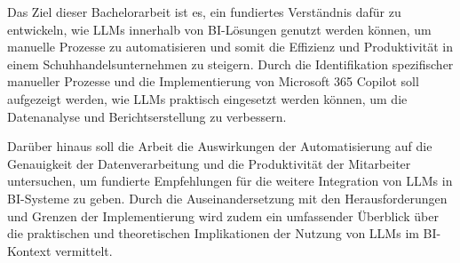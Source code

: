 Das Ziel dieser Bachelorarbeit ist es, ein fundiertes Verständnis dafür zu entwickeln, wie LLMs innerhalb von BI-Lösungen genutzt werden können, um manuelle Prozesse zu automatisieren und somit die Effizienz und Produktivität in einem Schuhhandelsunternehmen zu steigern. Durch die Identifikation spezifischer manueller Prozesse und die Implementierung von Microsoft 365 Copilot soll aufgezeigt werden, wie LLMs praktisch eingesetzt werden können, um die Datenanalyse und Berichtserstellung zu verbessern.

Darüber hinaus soll die Arbeit die Auswirkungen der Automatisierung auf die Genauigkeit der Datenverarbeitung und die Produktivität der Mitarbeiter untersuchen, um fundierte Empfehlungen für die weitere Integration von LLMs in BI-Systeme zu geben. Durch die Auseinandersetzung mit den Herausforderungen und Grenzen der Implementierung wird zudem ein umfassender Überblick über die praktischen und theoretischen Implikationen der Nutzung von LLMs im BI-Kontext vermittelt.

\clearpage